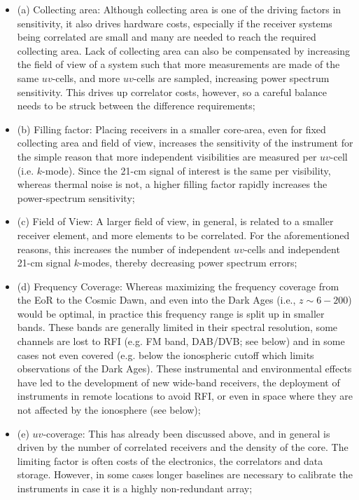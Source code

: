 \begin{itemize}
\item (a) Collecting area: Although collecting area is one of the driving factors in sensitivity, it also drives hardware costs, especially if the receiver systems being correlated are small and many are needed to reach the required collecting area. Lack of collecting area can also be compensated by increasing the field of view of a system such that more measurements are made of the same $uv$-cells, and more $uv$-cells are sampled, increasing power spectrum sensitivity. This drives up correlator costs, however, so a careful balance needs to be struck between the difference requirements; 
%
\item (b) Filling factor: Placing receivers in a smaller core-area, even for fixed collecting area and field of view, increases the sensitivity of the instrument for the simple reason that more independent visibilities are measured per $uv$-cell (i.e. $k$-mode). Since the 21-cm signal of interest is the same per visibility, whereas thermal noise is not, a higher filling factor rapidly increases the power-spectrum sensitivity; 
%
\item (c) Field of View: A larger field of view, in general, is related to a smaller receiver element, and more elements to be correlated. For the aforementioned reasons, this increases the number of independent $uv$-cells and independent 21-cm signal $k$-modes, thereby decreasing power spectrum errors; 
%
\item (d) Frequency Coverage: Whereas maximizing the frequency coverage from the EoR to the Cosmic Dawn, and even into the Dark Ages (i.e., $z\sim 6 - 200$) would be optimal, in practice this frequency range is split up in smaller bands. These bands are generally limited in their spectral resolution, some channels are lost to RFI (e.g. FM band, DAB/DVB; see below) and in some cases not even covered (e.g. below the ionospheric cutoff which limits observations of the Dark Ages). These instrumental and environmental effects have led to the development of new wide-band receivers, the deployment of instruments in remote locations to avoid RFI, or even in space where they are not affected by the ionosphere (see below); 
%
\item (e) $uv$-coverage: This has already been discussed above, and in general is driven by the number of correlated receivers and the density of the core. The limiting factor is often costs of the electronics, the correlators and data storage. However, in some cases longer baselines are necessary to calibrate the instruments in case it is a highly non-redundant array; 


\end{itemize}

